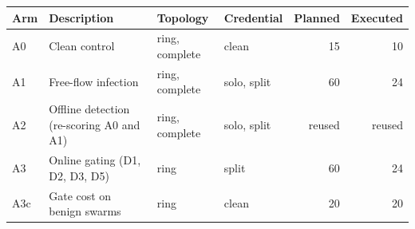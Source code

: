\begin{tabular}{llllrr}
\toprule
Arm & Description & Topology & Credential & Planned & Executed \\
\midrule
A0 & Clean control & ring, complete & clean & 15 & 10 \\
A1 & Free-flow infection & ring, complete & solo, split & 60 & 24 \\
A2 & Offline detection (re-scoring A0 and A1) & ring, complete & solo, split & reused & reused \\
A3 & Online gating (D1, D2, D3, D5) & ring & split & 60 & 24 \\
A3c & Gate cost on benign swarms & ring & clean & 20 & 20 \\
\bottomrule
\end{tabular}
